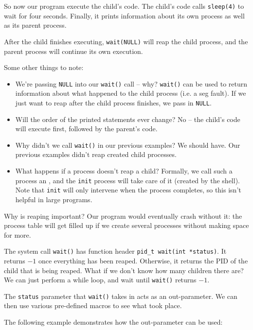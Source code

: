 So now our program execute the child's code. The child's code calls \verb!sleep(4)! to wait for four seconds. Finally, it prints information about its own process as well as its parent process. 


After the child finishes executing,  \verb!wait(NULL)! will reap the child process, and the parent process will continue its own execution.


Some other things to note: \begin{itemize}
    \item We're passing \verb!NULL! into our \verb!wait()! call -- why?  \verb!wait()! can be used to return information about what happened to the child process (i.e. a seg fault). If we just want to reap after the child process finishes, we pass in \verb!NULL!.
    \item Will the order of the printed statements ever change? No -- the child's code will execute first, followed by the parent's code.
    \item Why didn't we call \verb!wait()! in our previous examples? We should have. Our previous examples didn't reap created child processes.
    \item What happens if a process doesn't reap a child? Formally, we call such a process an , and the \verb!init! process will take care of it (created by the shell). Note that \verb!init! will only intervene when the process completes, so this isn't helpful in large programs.
\end{itemize}


Why is reaping important? Our program would eventually crash without it: the process table will get filled up if we create several processes without making space for more.


The system call \verb!wait()! has function header \verb!pid_t wait(int *status)!. It returns $-1$ once everything has been reaped. Otherwise, it returns the PID of the child that is being reaped. What if we don't know how many children there are? We can just perform a while loop, and wait until \verb!wait()! returns $-1$.

The \verb!status! parameter that \verb!wait()! takes in acts as an out-parameter. We can then use various pre-defined macros to see what took place.


The following example demonstrates how the out-parameter can be used:


\lstset{
caption=Wait Status
}
\begin{center}

\end{center}

